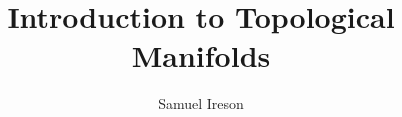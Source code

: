 

\usepackage[backend=biber]{biblatex}


\title{Introduction to Topological Manifolds}

\author{Samuel Ireson}


















